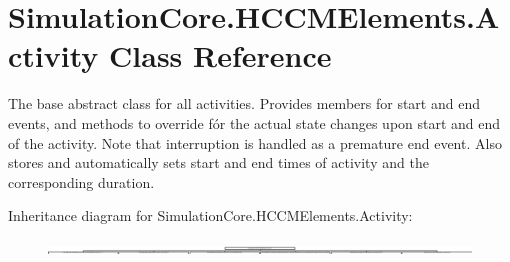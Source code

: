 \hypertarget{class_simulation_core_1_1_h_c_c_m_elements_1_1_activity}{}\section{Simulation\+Core.\+H\+C\+C\+M\+Elements.\+Activity Class Reference}
\label{class_simulation_core_1_1_h_c_c_m_elements_1_1_activity}


The base abstract class for all activities. Provides members for start and end events, and methods to override fór the actual state changes upon start and end of the activity. Note that interruption is handled as a premature end event. Also stores and automatically sets start and end times of activity and the corresponding duration.  


Inheritance diagram for Simulation\+Core.\+H\+C\+C\+M\+Elements.\+Activity\+:\begin{figure}[H]
\begin{center}
\leavevmode
\includegraphics[height=0.277365cm]{class_simulation_core_1_1_h_c_c_m_elements_1_1_activity}
\end{center}
\end{figure}
